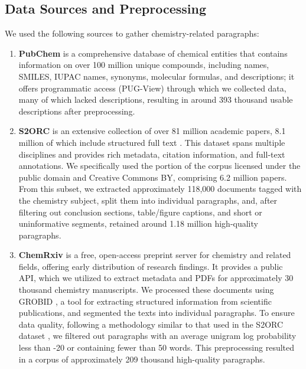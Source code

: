 \documentclass[twoside,twocolumn,9pt]{article}
\begin{document}
\subsection{Data Sources and Preprocessing}
We used the following sources to gather chemistry-related paragraphs:
\begin{enumerate}
\item \textbf{PubChem} is a comprehensive database of chemical entities that contains information on over 100 million unique compounds, including names, SMILES, IUPAC names, synonyms, molecular formulas, and descriptions; it offers programmatic access (PUG-View) \cite{kim2019pubchem} through which we collected data, many of which lacked descriptions, resulting in around 393 thousand usable descriptions after preprocessing.
\item \textbf{S2ORC} is an extensive collection of over 81 million academic papers, 8.1 million of which include structured full text \cite{lo2019s2orc, peS2o}. This dataset spans multiple disciplines and provides rich metadata, citation information, and full-text annotations. We specifically used the portion of the corpus licensed under the public domain and Creative Commons BY, comprising 6.2 million papers. From this subset, we extracted approximately 118,000 documents tagged with the chemistry subject, split them into individual paragraphs, and, after filtering out conclusion sections, table/figure captions, and short or uninformative segments, retained around 1.18 million high-quality paragraphs.
\item \textbf{ChemRxiv} is a free, open-access preprint server for chemistry and related fields, offering early distribution of research findings. It provides a public API, which we utilized to extract metadata and PDFs for approximately 30 thousand chemistry manuscripts. We processed these documents using GROBID \cite{GROBID}, a tool for extracting structured information from scientific publications, and segmented the texts into individual paragraphs. To ensure data quality, following a methodology similar to that used in the S2ORC dataset \cite{lo2019s2orc, peS2o}, we filtered out paragraphs with an average unigram log probability less than -20 or containing fewer than 50 words. This preprocessing resulted in a corpus of approximately 209 thousand high-quality paragraphs.
\end{enumerate}
\end{document}
